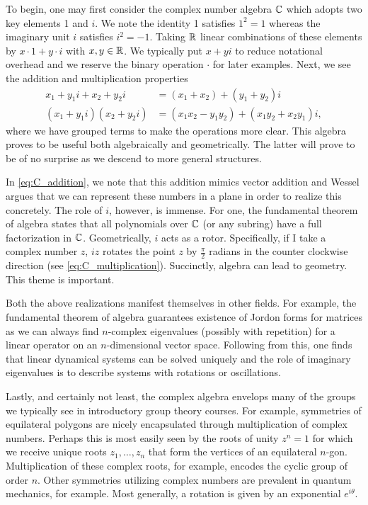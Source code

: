 \documentclass[12pt]{article}
\begin{document}
To begin, one may first consider the complex number algebra $\mathbb{C}$ which adopts two key elements 1 and $i$. We note the identity 1 satisfies  $1^2=1$ whereas the imaginary unit $i$ satisfies $i^2=-1$. Taking $\mathbb{R}$ linear combinations of these elements by $x\cdot 1 + y \cdot i$ with $x,y \in \mathbb{R}$. We typically put $x+yi$ to reduce notational overhead and we reserve the binary operation $\cdot$ for later examples. Next, we see the addition and multiplication properties
\begin{align}
\label{eq:C_addition}
    x_1 + y_1 i + x_2 + y_2i  &= (x_1+x_2)+(y_1+y_2)i\\
\label{eq:C_multiplication}
    (x_1 + y_1 i)(x_2 + y_2i) &= (x_1x_2-y_1y_2)+(x_1y_2+x_2y_1)i,
\end{align}
where we have grouped terms to make the operations more clear. This algebra proves to be useful both algebraically and geometrically. The latter will prove to be of no surprise as we descend to more general structures.

In \cref{eq:C_addition}, we note that this addition mimics vector addition and Wessel argues that we can represent these numbers in a plane in order to realize this concretely. The role of $i$, however, is immense. For one, the fundamental theorem of algebra states that all polynomials over $\mathbb{C}$ (or any subring) have a full factorization in $\mathbb{C}$. Geometrically, $i$ acts as a rotor. Specifically, if I take a complex number $z$, $iz$ rotates the point $z$ by $\frac{\pi}{2}$ radians in the counter clockwise direction (see \cref{eq:C_multiplication}). Succinctly, algebra can lead to geometry. This theme is important.

Both the above realizations manifest themselves in other fields. For example, the fundamental theorem of algebra guarantees existence of Jordon forms for matrices as we can always find $n$-complex eigenvalues (possibly with repetition) for a linear operator on an $n$-dimensional vector space. Following from this, one finds that linear dynamical systems can be solved uniquely and the role of imaginary eigenvalues is to describe systems with rotations or oscillations. 

Lastly, and certainly not least, the complex algebra envelops many of the groups we typically see in introductory group theory courses. For example, symmetries of equilateral polygons are nicely encapsulated through multiplication of complex numbers. Perhaps this is most easily seen by the roots of unity $z^n=1$ for which we receive unique roots $z_1,\dots,z_n$ that form the vertices of an equilateral $n$-gon. Multiplication of these complex roots, for example, encodes the cyclic group of order $n$. Other symmetries utilizing complex numbers are prevalent in quantum mechanics, for example. Most generally, a rotation is given by an exponential $e^{i\theta}$.
\end{document}
